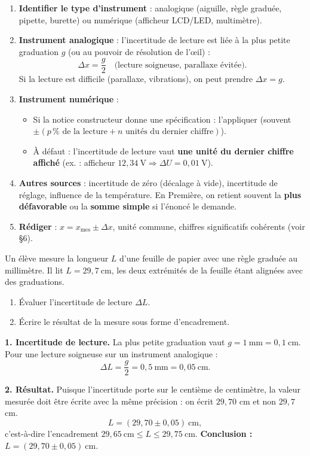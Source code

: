 \documentclass[11pt]{article}
\begin{document}
\begin{methode}
\begin{enumerate}
\item \textbf{Identifier le type d'instrument} : analogique (aiguille, règle graduée, pipette, burette) ou numérique (afficheur LCD/LED, multimètre).
\item \textbf{Instrument analogique} : l'incertitude de lecture est liée à la plus petite graduation $g$ (ou au pouvoir de résolution de l'œil) :
\[ \Delta x = \frac{g}{2} \quad \text{(lecture soigneuse, parallaxe évitée)}. \]
Si la lecture est difficile (parallaxe, vibrations), on peut prendre $\Delta x = g$.
\item \textbf{Instrument numérique} :
\begin{itemize}
\item Si la notice constructeur donne une spécification : l'appliquer (souvent $\pm (p\,\% \text{ de la lecture} + n \text{ unités du dernier chiffre})$).
\item À défaut : l'incertitude de lecture vaut \textbf{une unité du dernier chiffre affiché} (ex. : afficheur $12,34\ \text{V} \Rightarrow \Delta U = 0,01\ \text{V}$).
\end{itemize}
\item \textbf{Autres sources} : incertitude de zéro (décalage à vide), incertitude de réglage, influence de la température. En Première, on retient souvent la \textbf{plus défavorable} ou la \textbf{somme simple} si l'énoncé le demande.
\item \textbf{Rédiger} : $x = x_{\text{mes}} \pm \Delta x$, unité commune, chiffres significatifs cohérents (voir §6).
\end{enumerate}
\end{methode}

\begin{exoresolu}
Un élève mesure la longueur $L$ d'une feuille de papier avec une règle graduée au millimètre. Il lit $L = 29,7\ \text{cm}$, les deux extrémités de la feuille étant alignées avec des graduations.
\begin{enumerate}
\item Évaluer l'incertitude de lecture $\Delta L$.
\item Écrire le résultat de la mesure sous forme d'encadrement.
\end{enumerate}
\tcblower
\textbf{1. Incertitude de lecture.} La plus petite graduation vaut $g = 1\ \text{mm} = 0,1\ \text{cm}$. Pour une lecture soigneuse sur un instrument analogique :
\[ \Delta L = \frac{g}{2} = 0,5\ \text{mm} = 0,05\ \text{cm}. \]

\textbf{2. Résultat.} Puisque l'incertitude porte sur le centième de centimètre, la valeur mesurée doit être écrite avec la même précision : on écrit $29,70$ cm et non $29,7$ cm.
\[ L = (29,70 \pm 0,05)\ \text{cm}, \]
c'est-à-dire l'encadrement $29,65\ \text{cm} \leq L \leq 29,75\ \text{cm}$.
\textbf{Conclusion :} $L = (29,70 \pm 0,05)\ \text{cm}$.
\end{exoresolu}
\end{document}

